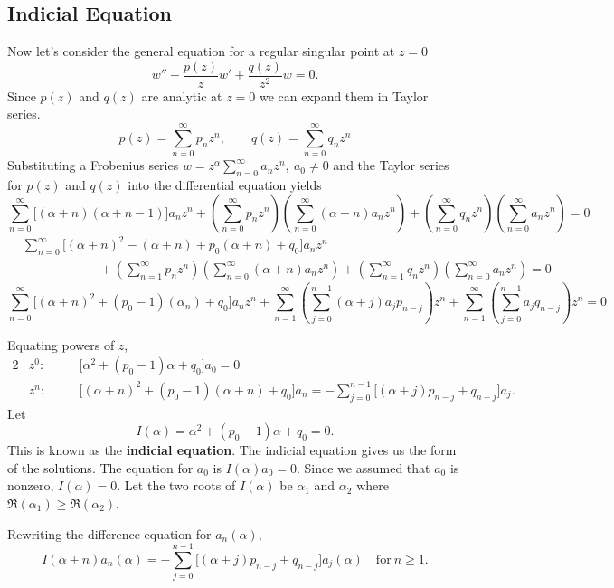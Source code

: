 \subsection{Indicial Equation}
Now let's consider the general equation for a regular singular point at
$z = 0$
\[ w'' + \frac{p(z)}{z} w' + \frac{q(z)}{z^2} w = 0.\]
Since $p(z)$ and $q(z)$ are analytic at $z=0$ we can expand them in
Taylor series.
\[ p(z) = \sum_{n=0}^\infty p_n z^n, 
\qquad q(z) = \sum_{n=0}^\infty q_n z^n \]
Substituting a Frobenius series $w = z^\alpha \sum_{n=0}^\infty a_n z^n,\ 
a_0 \neq 0$ and the Taylor series for $p(z)$ and $q(z)$ into the differential
equation yields
\[\sum_{n=0}^\infty \Big[(\alpha+n)(\alpha+n-1)\Big]a_n z^n
+ \left(\sum_{n=0}^\infty p_n z^n\right)
\left(\sum_{n=0}^\infty (\alpha+n) a_n z^n\right)
+ \left(\sum_{n=0}^\infty q_n z^n\right)\left(\sum_{n=0}^\infty a_n z^n\right) = 0\]
\begin{align*}
  &\sum_{n=0}^\infty \Big[(\alpha+n)^2 - (\alpha+n) + p_0(\alpha+n)+q_0 \Big]a_n z^n \\
  &\qquad \qquad \qquad + \left(\sum_{n=1}^\infty p_n z^n\right)
  \left(\sum_{n=0}^\infty (\alpha+n) a_n z^n\right)
  + \left(\sum_{n=1}^\infty q_n z^n\right)\left(\sum_{n=0}^\infty a_n z^n\right) = 0
\end{align*}
\[\sum_{n=0}^\infty \Big[(\alpha+n)^2 + (p_0-1)(\alpha_n) + q_0 \Big]a_n z^n
+ \sum_{n=1}^\infty \left( \sum_{j=0}^{n-1} (\alpha+j) a_j p_{n-j}
\right) z^n
+ \sum_{n=1}^\infty \left( \sum_{j=0}^{n-1} a_j q_{n-j} \right) z^n = 0\]


Equating powers of $z$,
\begin{alignat*}{2}
  &z^0: &\quad    &\Big[\alpha^2 + (p_0-1)\alpha + q_0\Big]a_0 = 0 \\
  &z^n: &\quad    &\Big[(\alpha+n)^2 + (p_0-1)(\alpha+n) + q_0\Big]a_n
  = -\sum_{j=0}^{n-1}\Big[(\alpha+j)p_{n-j} + q_{n-j}\Big]a_j.
\end{alignat*}
Let
\[ I(\alpha) = \alpha^2 + (p_0-1)\alpha + q_0 = 0.\]
This is known as the \textbf{indicial equation}.  
The indicial equation gives us the 
form of the solutions.  
The equation for $a_0$ is $I(\alpha)a_0 = 0$.  Since we assumed that $a_0$
is nonzero, $I(\alpha) = 0$.  Let the two roots of $I(\alpha)$ be 
$\alpha_1$ and $\alpha_2$ where $\Re(\alpha_1) \geq \Re(\alpha_2)$.

Rewriting the difference equation for $a_n(\alpha)$,
\begin{equation} \label{diff-a_n}
  I(\alpha+n)a_n(\alpha) 
  = - \sum_{j=0}^{n-1}\Big[(\alpha+j)p_{n-j} + q_{n-j}\Big]a_j(\alpha)
  \quad \mathrm{for}\ n \geq 1.
\end{equation}

